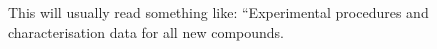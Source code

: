 \documentclass[journal=jacsat,manuscript=article]{achemso}
\begin{document}
\begin{suppinfo}

This will usually read something like: ``Experimental procedures and
characterisation data for all new compounds.

\end{suppinfo}


\end{document}
